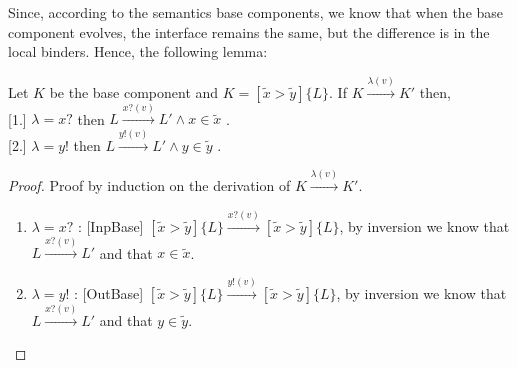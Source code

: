  Since, according to the semantics base components, we know that when the base component evolves, the interface remains the same, but the difference is in the local binders. Hence, the following lemma:
 
 \begin{lemma} Let $K$ be the base component and $K=[\tilde{x}>\tilde{y}]\{L\}$. If $K \xrightarrow{\lambda(v)} K'$ then, \\
 
 [1.] $\lambda=x?$ then $L\xrightarrow{x?(v)}L' \wedge x\in\tilde{x}$ . \\
 
 [2.] $\lambda=y!$ then $L\xrightarrow{y!(v)}L' \wedge y\in\tilde{y}$ .
 
 
 \end{lemma}
 
 \begin{proof} Proof by induction on the derivation of $K\xrightarrow{\lambda(v)} K'$. \\
\begin{enumerate}
    \item $\lambda=x?$ : [InpBase] $[\tilde{x}>\tilde{y}]\{L\}\xrightarrow{x?(v)}[\tilde{x}>\tilde{y}]\{L\}$, by inversion we know that $L\xrightarrow{x?(v)}L'$ and that $x\in\tilde{x}$.
      \item $\lambda=y!$ : [OutBase] $[\tilde{x}>\tilde{y}]\{L\}\xrightarrow{y!(v)}[\tilde{x}>\tilde{y}]\{L\}$, by inversion we know that $L\xrightarrow{x?(v)}L'$ and that $y\in\tilde{y}$.
\end{enumerate}
 
 \end{proof}
 

 
 
 